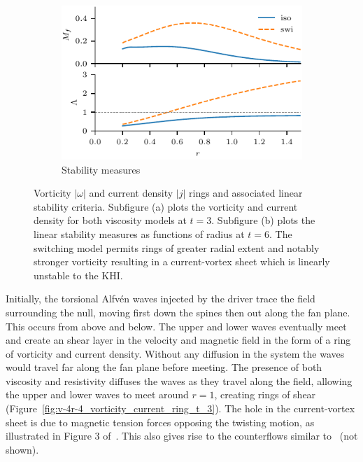 \begin{figure}[t]
\begin{subfigure}{0.49\textwidth}
      \includegraphics[width=\linewidth]{v-4r-4_mach_t_6}
      \caption{Stability measures}%
      \label{fig:v-4r-4_mach_t_6}
    \end{subfigure}
\caption{Vorticity $|\omega|$ and current density $|j|$ rings and associated linear stability criteria. Subfigure (a) plots the vorticity and current density for both viscosity models at $t=3$. Subfigure (b) plots the linear stability measures as functions of radius at $t=6$. The switching model permits rings of greater radial extent and notably stronger vorticity resulting in a current-vortex sheet which is linearly unstable to the KHI.}
\label{fig:rings_and_stability}%
\end{figure}

Initially, the torsional Alfv\'en waves injected by the driver trace the field surrounding the null, moving first down the spines then out along the fan plane. This occurs from above and below. The upper and lower waves eventually meet and create an shear layer in the velocity and magnetic field in the form of a ring of vorticity and current density. Without any diffusion in the system the waves would travel far along the fan plane before meeting. The presence of both viscosity and resistivity diffuses the waves as they travel along the field, allowing the upper and lower waves to meet around $r=1$, creating rings of shear  (Figure~\ref{fig:v-4r-4_vorticity_current_ring_t_3}). The hole in the current-vortex sheet is due to magnetic tension forces opposing the twisting motion, as illustrated in Figure 3 of~\cite{wyperKelvinHelmholtzInstabilityCurrentvortex2013}. This also gives rise to the counterflows similar to~\cite{wyperKelvinHelmholtzInstabilityCurrentvortex2013,galsgaardNumericalExperimentsWave2003} (not shown).

